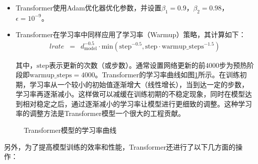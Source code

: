 \begin{itemize}
\vspace{0.5em}
\item	Transformer使用Adam优化器优化参数，并设置$\beta_1=0.9$，$\beta_2=0.98$，$\epsilon=10^{-9}$。
\item Transformer在学习率中同样应用了学习率{\small{}}（Warmup）策略，其计算如下：
\begin{eqnarray}
lrate &=& d_{\textrm{model}}^{-0.5} \cdot \textrm{min} (\textrm{step}^{-0.5} , \textrm{step} \cdot \textrm{warmup\_steps}^{-1.5})
\label{eq:12-15}
\end{eqnarray}

\vspace{0.5em}
其中，$\textrm{step}$表示更新的次数（或步数）。通常设置网络更新的前4000步为预热阶段即$\textrm{warmup\_steps}=4000$。Transformer的学习率曲线如图\ref{fig:12-17}所示。在训练初期，学习率从一个较小的初始值逐渐增大（线性增长），当到达一定的步数，学习率再逐渐减小。这样做可以减缓在训练初期的不稳定现象，同时在模型达到相对稳定之后，通过逐渐减小的学习率让模型进行更细致的调整。这种学习率的调整方法是Transformer模型一个很大的工程贡献。
\vspace{0.5em}
\end{itemize}

\begin{figure}[htp]
\centering

\caption{Transformer模型的学习率曲线}
\label{fig:12-17}
\end{figure}

\parinterval 另外，为了提高模型训练的效率和性能，Transformer还进行了以下几方面的操作：

